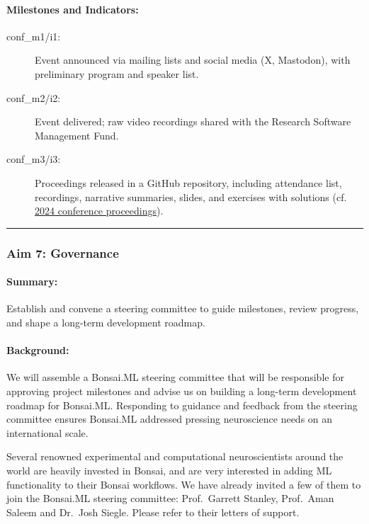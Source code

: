 \paragraph{Milestones and Indicators:}  

\begin{description}
    \item[conf\_m1/i1:] Event announced via mailing lists and social media (X, Mastodon), with preliminary program and speaker list.  
    \item[conf\_m2/i2:] Event delivered; raw video recordings shared with the Research Software Management Fund.  
    \item[conf\_m3/i3:] Proceedings released in a GitHub repository, including attendance list, recordings, narrative summaries, slides, and exercises with solutions (cf. \href{https://github.com/joacorapela/bonsaiConference2024Proceedings}{2024 conference proceedings}).  
\end{description}

\noindent\rule{\textwidth}{1pt}
\subsubsection{Aim 7: Governance}

\paragraph{Summary:} Establish and convene a steering committee to guide
milestones, review progress, and shape a long-term development roadmap.

\paragraph{Background:} We will assemble a Bonsai.ML steering committee that
will be responsible for approving project milestones and advise us on building
a long-term development roadmap for Bonsai.ML.  Responding to guidance and
feedback from the steering committee ensures Bonsai.ML addressed pressing
neuroscience needs on an international scale.

Several renowned experimental and computational neuroscientists around the
world are heavily invested in Bonsai, and are very interested in adding ML
functionality to their Bonsai workflows. We have already invited a few of them
to join the Bonsai.ML steering committee: Prof.~Garrett Stanley, Prof.~Aman
Saleem and Dr.~Josh Siegle. Please refer to their letters of support.

